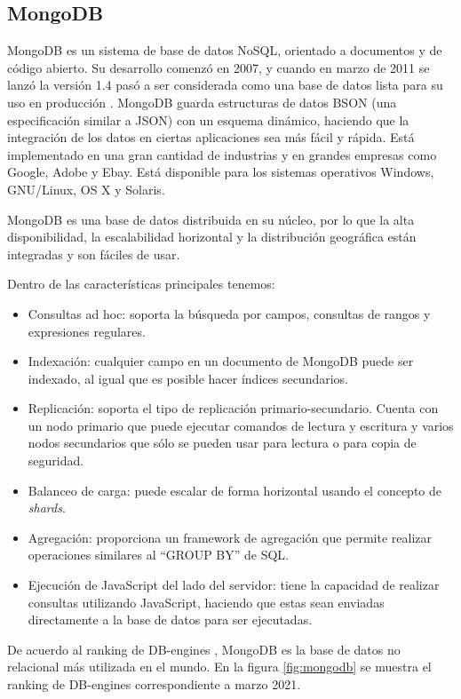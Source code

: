 \subsection{MongoDB}

MongoDB es un sistema de base de datos NoSQL, orientado a documentos y de código abierto. Su desarrollo comenzó en 2007, y cuando en marzo de 2011 se lanzó la versión 1.4 pasó a ser considerada como una base de datos lista para su uso en producción \citep{WEBSITE:mongo}. MongoDB guarda estructuras de datos BSON (una especificación similar a JSON) con un esquema dinámico, haciendo que la integración de los datos en ciertas aplicaciones sea más fácil y rápida. Está implementado en una gran cantidad de industrias y en grandes empresas como Google, Adobe y Ebay. Está disponible para los sistemas operativos Windows, GNU/Linux, OS X y Solaris. 

MongoDB es una base de datos distribuida en su núcleo, por lo que la alta disponibilidad, la escalabilidad horizontal y la distribución geográfica están integradas y son fáciles de usar. 

Dentro de las características principales tenemos: 
\begin{itemize}
\item Consultas ad hoc: soporta la búsqueda por campos, consultas de rangos y expresiones regulares.
\item Indexación: cualquier campo en un documento de MongoDB puede ser indexado, al igual que es posible hacer índices secundarios. 
\item Replicación: soporta el tipo de replicación primario-secundario. Cuenta con un nodo primario que puede ejecutar comandos de lectura y escritura y varios nodos secundarios que sólo se pueden usar para lectura o para copia de seguridad.
\item Balanceo de carga: puede escalar de forma horizontal usando el concepto de \textit{shards}. 
\item Agregación: proporciona un framework de agregación que permite realizar operaciones similares al ``GROUP BY'' de SQL.
\item Ejecución de JavaScript del lado del servidor: tiene la capacidad de realizar consultas utilizando JavaScript, haciendo que estas sean enviadas directamente a la base de datos para ser ejecutadas.
\end{itemize}

De acuerdo al ranking de DB-engines \citep{WEBSITE:dbengine}, MongoDB es la base de datos no relacional más utilizada en el mundo. En la figura \ref{fig:mongodb} se muestra el ranking de DB-engines correspondiente a marzo 2021.

